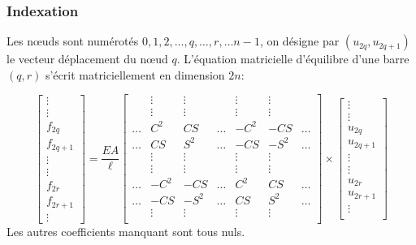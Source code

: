 \documentclass{beamer}
\begin{document}
\begin{frame}[fragile]
\frametitle{Indexation}
Les nœuds sont numérotés $0,1,2,\dots ,q,\dots,r,\dots n-1$, on désigne par $(u_{2q},u_{2q+1})$ le vecteur déplacement du nœud $q$. L'équation matricielle d'équilibre d'une barre $(q,r)$ s'écrit matriciellement  en dimension $2n$:

\[
\begin{bmatrix}
  \vdots\\
 \vdots\\
     f_{2q} \\
    f_{2q+1} \\
   \vdots\\
     \vdots\\
     f_{2r} \\
     f_{2r+1} \\
     \vdots
\end{bmatrix}
=\frac{E A}{\ell} 
\begin{bmatrix}
        & \vdots & \vdots & & \vdots& \vdots&  \\
        & \vdots & \vdots & & \vdots& \vdots&  \\
     \dots      & C^2 & CS & \dots & -C^2& -CS& \dots \\
    \dots       & CS & S^2& \dots & -CS& -S^2& \dots\\
        & \vdots & \vdots & & \vdots& \vdots&  \\
        & \vdots & \vdots & & \vdots& \vdots&  \\
     \dots      & -C^2 & -CS & \dots & C^2& CS& \dots\\
      \dots      & -CS & -S^2 & \dots & CS& S^2& \dots\\
        & \vdots & \vdots & & \vdots& \vdots&  \\

\end{bmatrix}
\times
\begin{bmatrix}
  \vdots\\
 \vdots\\
     u_{2q} \\
    u_{2q+1} \\
   \vdots\\
     \vdots\\
     u_{2r} \\
     u_{2r+1} \\
     \vdots\\
\end{bmatrix}
\]
Les autres coefficients manquant sont tous nuls. 

\end{frame}
\end{document}
